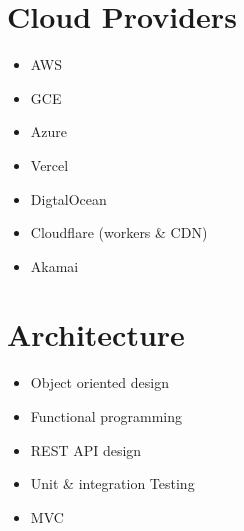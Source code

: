 \documentclass[11pt]{amsart}
\begin{document}
\hypertarget{x-cloud-providers}{\section*{Cloud Providers}}
\begin{itemize}

\item AWS

\item GCE

\item Azure

\item Vercel

\item DigtalOcean

\item Cloudflare (workers & CDN)

\item Akamai

\end{itemize}


\hypertarget{x-architecture}{\section*{Architecture}}
\begin{itemize}

\item Object oriented design

\item Functional programming

\item REST API design

\item Unit & integration Testing

\item MVC

\end{itemize}
\end{document}
